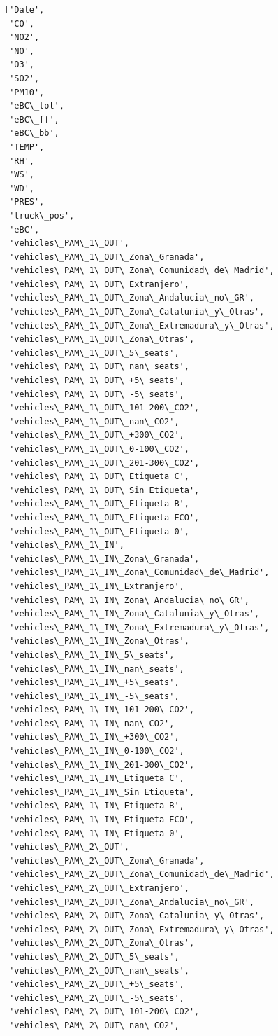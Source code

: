 \documentclass[11pt]{article}
\begin{document}
    \begin{Verbatim}[commandchars=\\\{\}]
['Date',
 'CO',
 'NO2',
 'NO',
 'O3',
 'SO2',
 'PM10',
 'eBC\_tot',
 'eBC\_ff',
 'eBC\_bb',
 'TEMP',
 'RH',
 'WS',
 'WD',
 'PRES',
 'truck\_pos',
 'eBC',
 'vehicles\_PAM\_1\_OUT',
 'vehicles\_PAM\_1\_OUT\_Zona\_Granada',
 'vehicles\_PAM\_1\_OUT\_Zona\_Comunidad\_de\_Madrid',
 'vehicles\_PAM\_1\_OUT\_Extranjero',
 'vehicles\_PAM\_1\_OUT\_Zona\_Andalucia\_no\_GR',
 'vehicles\_PAM\_1\_OUT\_Zona\_Catalunia\_y\_Otras',
 'vehicles\_PAM\_1\_OUT\_Zona\_Extremadura\_y\_Otras',
 'vehicles\_PAM\_1\_OUT\_Zona\_Otras',
 'vehicles\_PAM\_1\_OUT\_5\_seats',
 'vehicles\_PAM\_1\_OUT\_nan\_seats',
 'vehicles\_PAM\_1\_OUT\_+5\_seats',
 'vehicles\_PAM\_1\_OUT\_-5\_seats',
 'vehicles\_PAM\_1\_OUT\_101-200\_CO2',
 'vehicles\_PAM\_1\_OUT\_nan\_CO2',
 'vehicles\_PAM\_1\_OUT\_+300\_CO2',
 'vehicles\_PAM\_1\_OUT\_0-100\_CO2',
 'vehicles\_PAM\_1\_OUT\_201-300\_CO2',
 'vehicles\_PAM\_1\_OUT\_Etiqueta C',
 'vehicles\_PAM\_1\_OUT\_Sin Etiqueta',
 'vehicles\_PAM\_1\_OUT\_Etiqueta B',
 'vehicles\_PAM\_1\_OUT\_Etiqueta ECO',
 'vehicles\_PAM\_1\_OUT\_Etiqueta 0',
 'vehicles\_PAM\_1\_IN',
 'vehicles\_PAM\_1\_IN\_Zona\_Granada',
 'vehicles\_PAM\_1\_IN\_Zona\_Comunidad\_de\_Madrid',
 'vehicles\_PAM\_1\_IN\_Extranjero',
 'vehicles\_PAM\_1\_IN\_Zona\_Andalucia\_no\_GR',
 'vehicles\_PAM\_1\_IN\_Zona\_Catalunia\_y\_Otras',
 'vehicles\_PAM\_1\_IN\_Zona\_Extremadura\_y\_Otras',
 'vehicles\_PAM\_1\_IN\_Zona\_Otras',
 'vehicles\_PAM\_1\_IN\_5\_seats',
 'vehicles\_PAM\_1\_IN\_nan\_seats',
 'vehicles\_PAM\_1\_IN\_+5\_seats',
 'vehicles\_PAM\_1\_IN\_-5\_seats',
 'vehicles\_PAM\_1\_IN\_101-200\_CO2',
 'vehicles\_PAM\_1\_IN\_nan\_CO2',
 'vehicles\_PAM\_1\_IN\_+300\_CO2',
 'vehicles\_PAM\_1\_IN\_0-100\_CO2',
 'vehicles\_PAM\_1\_IN\_201-300\_CO2',
 'vehicles\_PAM\_1\_IN\_Etiqueta C',
 'vehicles\_PAM\_1\_IN\_Sin Etiqueta',
 'vehicles\_PAM\_1\_IN\_Etiqueta B',
 'vehicles\_PAM\_1\_IN\_Etiqueta ECO',
 'vehicles\_PAM\_1\_IN\_Etiqueta 0',
 'vehicles\_PAM\_2\_OUT',
 'vehicles\_PAM\_2\_OUT\_Zona\_Granada',
 'vehicles\_PAM\_2\_OUT\_Zona\_Comunidad\_de\_Madrid',
 'vehicles\_PAM\_2\_OUT\_Extranjero',
 'vehicles\_PAM\_2\_OUT\_Zona\_Andalucia\_no\_GR',
 'vehicles\_PAM\_2\_OUT\_Zona\_Catalunia\_y\_Otras',
 'vehicles\_PAM\_2\_OUT\_Zona\_Extremadura\_y\_Otras',
 'vehicles\_PAM\_2\_OUT\_Zona\_Otras',
 'vehicles\_PAM\_2\_OUT\_5\_seats',
 'vehicles\_PAM\_2\_OUT\_nan\_seats',
 'vehicles\_PAM\_2\_OUT\_+5\_seats',
 'vehicles\_PAM\_2\_OUT\_-5\_seats',
 'vehicles\_PAM\_2\_OUT\_101-200\_CO2',
 'vehicles\_PAM\_2\_OUT\_nan\_CO2',

\end{Verbatim}
\end{document}
